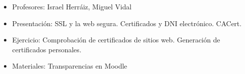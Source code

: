 \documentclass[a4paper,12pt]{article}
\begin{document}
\begin{itemize}
\item Profesores: Israel Herr\'aiz, Miguel Vidal
\item Presentación: SSL y la web segura. Certificados y DNI
  electrónico. CACert.
\item Ejercicio: Comprobación de certificados de sitios
  web. Generación de certificados personales.
\item Materiales: Transparencias en Moodle
\end{itemize}







\end{document}

